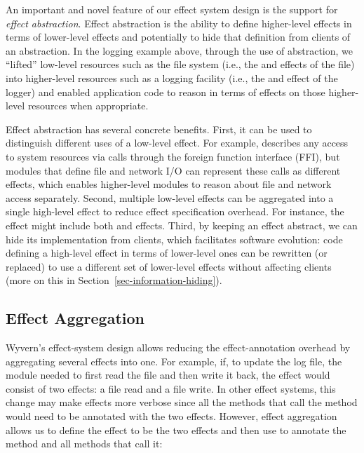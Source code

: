An important and novel feature of our effect system design is the support for \textit{effect abstraction}. Effect abstraction is the ability to define higher-level effects in terms of lower-level effects and potentially to hide that definition from clients of an abstraction. In the logging example above, through the use of abstraction, we ``lifted'' low-level resources such as the file system (i.e., the  and  effects of the file) into higher-level resources such as a logging facility (i.e., the  and  effect of the logger) and enabled application code to reason in terms of effects on those higher-level resources when appropriate.

Effect abstraction has several concrete benefits. First, it can be used to distinguish different uses of a low-level effect. For example,  describes any access to system resources via calls through the foreign function interface (FFI), but modules that define file and network I/O can represent these calls as different effects, which enables higher-level modules to reason about file and network access separately. Second, multiple low-level effects can be aggregated into a single high-level effect to reduce effect specification overhead. For instance, the  effect might include both  and  effects. Third, by keeping an effect abstract, we can hide its implementation from clients, which facilitates software evolution: code defining a high-level effect in terms of lower-level ones can be rewritten (or replaced) to use a different set of lower-level effects without affecting clients (more on this in Section~\ref{sec-information-hiding}).


\subsection{Effect Aggregation}

Wyvern's effect-system design allows reducing the effect-annotation overhead by aggregating several effects into one. For example, if, to update the log file, the  module needed to first read the file and then write it back, the  effect would consist of two effects: a file read and a file write. In other effect systems, this change may make effects more verbose since all the methods that call the  method would need to be annotated with the two effects. However, effect aggregation allows us to define the  effect to be the two effects and then use  to annotate the  method and all methods that call it:

